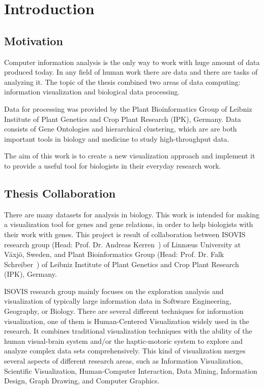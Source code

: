 \section{Introduction}
\label{sec:introduction}

\subsection{Motivation}
\label{sec:motivation}

Computer information analysis is the only way to work with huge amount of data produced today. In any field of human work there are data and there are tasks of analyzing it. The topic of the thesis combined two areas of data computing: information visualization and biological data processing.

Data for processing was provided by the Plant Bioinformatics Group of Leibniz Institute of Plant Genetics and Crop Plant Research (IPK), Germany. Data consists of Gene Ontologies and hierarchical clustering, which are are both important tools in biology and medicine to study high-throughput data.

The aim of this work is to create a new visualization approach and implement it to provide a useful tool for biologists in their everyday research work.


\subsection{Thesis Collaboration}
There are many datasets for analysis in biology. This work is intended for making a visualization tool for genes and gene relations, in order to help biologists
with their work with genes. This project is result of collaboration between ISOVIS research group (Head: Prof. Dr. Andreas Kerren~\cite{Kerren}) of Linn\ae us University at V\"axj\"o, Sweden, and Plant Bioinformatics Group (Head: Prof. Dr. Falk Schreiber~\cite{Schreiber}) of Leibniz Institute of Plant Genetics and Crop Plant Research (IPK), Germany.


ISOVIS research group mainly focuses on the exploration analysis and visualization of typically large information data in Software Engineering, Geography, or Biology. There are several different techniques for information visualization, one of them is Human-Centered Visualization widely used in the research. It combines traditional visualization techniques with the ability of the human visual-brain system and/or the haptic-motoric system to explore and analyze complex data sets comprehensively. This kind of visualization merges several aspects of different research areas, such as Information Visualization, Scientific Visualization, Human-Computer Interaction, Data Mining, Information Design, Graph Drawing, and Computer Graphics.


